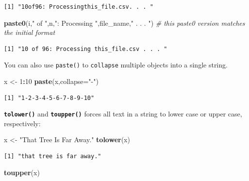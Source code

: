 \documentclass[
]{book}
\newenvironment{Shaded}{\begin{snugshade}}{\end{snugshade}}
\newcommand{\CommentTok}[1]{\textcolor[rgb]{0.56,0.35,0.01}{\textit{#1}}}
\newcommand{\DataTypeTok}[1]{\textcolor[rgb]{0.13,0.29,0.53}{#1}}
\newcommand{\DecValTok}[1]{\textcolor[rgb]{0.00,0.00,0.81}{#1}}
\newcommand{\KeywordTok}[1]{\textcolor[rgb]{0.13,0.29,0.53}{\textbf{#1}}}
\newcommand{\NormalTok}[1]{#1}
\newcommand{\OperatorTok}[1]{\textcolor[rgb]{0.81,0.36,0.00}{\textbf{#1}}}
\newcommand{\StringTok}[1]{\textcolor[rgb]{0.31,0.60,0.02}{#1}}
\begin{document}
\begin{verbatim}
[1] "10of96: Processingthis_file.csv. . . "
\end{verbatim}

\begin{Shaded}
\begin{Highlighting}[]
\KeywordTok{paste0}\NormalTok{(i,}\StringTok{" of "}\NormalTok{,n,}\StringTok{": Processing "}\NormalTok{,file_name,}\StringTok{" . . . "}\NormalTok{) }\CommentTok{# this paste0 version matches the initial format}
\end{Highlighting}
\end{Shaded}

\begin{verbatim}
[1] "10 of 96: Processing this_file.csv . . . "
\end{verbatim}

You can also use \texttt{paste()} to \texttt{collapse} multiple objects into a single string.

\begin{Shaded}
\begin{Highlighting}[]
\NormalTok{x <-}\StringTok{ }\DecValTok{1}\OperatorTok{:}\DecValTok{10}
\KeywordTok{paste}\NormalTok{(x,}\DataTypeTok{collapse=}\StringTok{"-"}\NormalTok{)}
\end{Highlighting}
\end{Shaded}

\begin{verbatim}
[1] "1-2-3-4-5-6-7-8-9-10"
\end{verbatim}

\textbf{\texttt{tolower()}} and \textbf{\texttt{toupper()}} forces all text in a string to lower case or upper case, respectively:

\begin{Shaded}
\begin{Highlighting}[]
\NormalTok{x <-}\StringTok{ "That Tree Is Far Away."}
\KeywordTok{tolower}\NormalTok{(x)}
\end{Highlighting}
\end{Shaded}

\begin{verbatim}
[1] "that tree is far away."
\end{verbatim}

\begin{Shaded}
\begin{Highlighting}[]
\KeywordTok{toupper}\NormalTok{(x)}
\end{Highlighting}
\end{Shaded}
\end{document}

